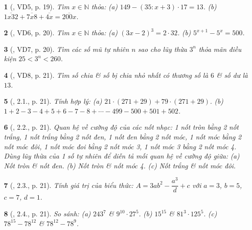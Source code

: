 \documentclass{article}
\newtheorem{baitoan}{}
\begin{document}
\begin{baitoan}[\cite{Binh_boi_duong_Toan_6_tap_1}, VD5, p. 19]
	Tìm $x\in\mathbb{N}$ thỏa: (a) $149 - (35:x + 3)\cdot17 = 13$. (b) $\overline{1x32} + \overline{7x8} + \overline{4x} = \overline{200x}$.
\end{baitoan}

\begin{baitoan}[\cite{Binh_boi_duong_Toan_6_tap_1}, VD6, p. 20]
	Tìm $x\in\mathbb{N}$ thỏa: (a) $(3x - 2)^3 = 2\cdot32$. (b) $5^{x+1} - 5^x = 500$.
\end{baitoan}

\begin{baitoan}[\cite{Binh_boi_duong_Toan_6_tap_1}, VD7, p. 20]
	Tìm các số mũ tự nhiên $n$ sao cho lũy thừa $3^n$ thỏa mãn điều kiện $25 < 3^n < 260$.
\end{baitoan}

\begin{baitoan}[\cite{Binh_boi_duong_Toan_6_tap_1}, VD8, p. 21]
	Tìm số chia \& số bị chia nhỏ nhất có thương số là $6$ \& số dư là $13$.
\end{baitoan}

\begin{baitoan}[\cite{Binh_boi_duong_Toan_6_tap_1}, 2.1., p. 21]
	Tính hợp lý: (a) $21\cdot(271 + 29) + 79\cdot(271 + 29)$. (b) $1 + 2 - 3 - 4 + 5 + 6 - 7 - 8 + \cdots - 499 - 500 + 501 + 502$.
\end{baitoan}

\begin{baitoan}[\cite{Binh_boi_duong_Toan_6_tap_1}, 2.2., p. 21]
	Quan hệ về cường độ của các nốt nhạc: 1 nốt tròn bằng 2 nốt trắng, 1 nốt trắng bằng 2 nốt đen, 1 nốt đen bằng 2 nốt móc, 1 nốt móc bằng 2 nốt móc đôi, 1 nốt móc đoi bằng 2 nốt móc 3, 1 nốt móc 3 bằng 2 nốt móc 4. Dùng lũy thừa của 1 số tự nhiên để diễn tả mối quan hệ về cường độ giữa: (a) Nốt tròn \& nốt đen. (b) Nốt tròn \& nốt móc 4. (c) Nốt trắng \& nốt móc đôi.
\end{baitoan}

\begin{baitoan}[\cite{Binh_boi_duong_Toan_6_tap_1}, 2.3., p. 21]
	Tính giá trị của biểu thức: $A = 3ab^2 -  \dfrac{a^3}{d} + c$ với $a = 3$, $b = 5$, $c = 7$, $d = 1$.
\end{baitoan}

\begin{baitoan}[\cite{Binh_boi_duong_Toan_6_tap_1}, 2.4., p. 21]
	So sánh: (a) $243^7$ \& $9^{10}\cdot27^5$. (b) $15^{15}$ \& $81^3\cdot125^5$. (c) $78^{15} - 78^{12}$ \& $78^{12} - 78^9$.
\end{baitoan}
\end{document}
